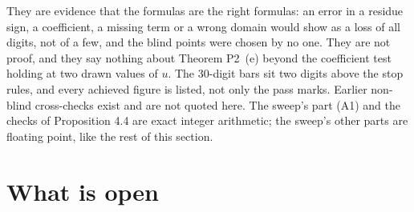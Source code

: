\documentclass[11pt]{article}
\begin{document}
They are evidence that the formulas are the right formulas: an error in a residue sign, a coefficient, a missing term or a wrong domain would show as a loss of all digits, not of a few, and the blind points were chosen by no one. They are not proof, and they say nothing about Theorem P2~(e) beyond the coefficient test holding at two drawn values of $u$. The 30-digit bars sit two digits above the stop rules, and every achieved figure is listed, not only the pass marks. Earlier non-blind cross-checks exist and are not quoted here. The sweep's part (A1) and the checks of Proposition 4.4 are exact integer arithmetic; the sweep's other parts are floating point, like the rest of this section.

\section{What is open}\label{sec:open}
\end{document}
